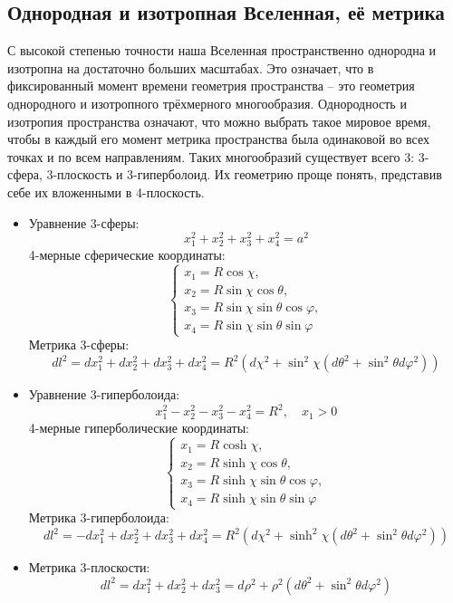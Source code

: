 \documentclass[12pt]{article}
\theoremstyle{definition}
\begin{document}
\subsection{Однородная и изотропная Вселенная, её метрика}
С высокой степенью точности наша Вселенная пространственно однородна и изотропна на достаточно больших масштабах. Это означает, что в фиксированный момент времени геометрия пространства -- это геометрия однородного и изотропного трёхмерного многообразия. Однородность и изотропия пространства означают, что можно выбрать такое мировое время, чтобы в каждый его момент метрика пространства была одинаковой во всех точках и по всем направлениям. Таких многообразий существует всего 3: 3-сфера, 3-плоскость и 3-гиперболоид. Их геометрию проще понять, представив себе их вложенными в 4-плоскость.
\begin{itemize}
    \item Уравнение 3-сферы:
    \begin{equation}
        x_1^2+x_2^2+x_3^2+x_4^2=a^2
    \end{equation}
    4-мерные сферические координаты:
    \begin{equation}
        \begin{cases}
            x_1=R\cos\chi,\\
            x_2=R\sin\chi\cos\theta,\\
            x_3=R\sin\chi\sin\theta\cos\varphi,\\
            x_4=R\sin\chi\sin\theta\sin\varphi
        \end{cases}
    \end{equation}
    Метрика 3-сферы:
    \begin{equation}
        dl^2=dx_1^2+dx_2^2+dx_3^2+dx_4^2=R^2(d\chi^2+\sin^2\chi(d\theta^2+\sin^2\theta d\varphi^2))
    \end{equation}
    \item Уравнение 3-гиперболоида:
    \begin{equation}
        x_1^2-x_2^2-x_3^2-x_4^2=R^2,\quad x_1>0
    \end{equation}
    4-мерные гиперболические координаты:
    \begin{equation}
        \begin{cases}
            x_1=R\cosh\chi,\\
            x_2=R\sinh\chi\cos\theta,\\
            x_3=R\sinh\chi\sin\theta\cos\varphi,\\
            x_4=R\sinh\chi\sin\theta\sin\varphi
        \end{cases}
    \end{equation}
    Метрика 3-гиперболоида:
    \begin{equation}
        dl^2=-dx_1^2+dx_2^2+dx_3^2+dx_4^2=R^2(d\chi^2+\sinh^2\chi(d\theta^2+\sin^2\theta d\varphi^2))
    \end{equation}
    \item Метрика 3-плоскости:
    \begin{equation}
        dl^2=dx_1^2+dx_2^2+dx_3^2=d\rho^2+\rho^2(d\theta^2+\sin^2\theta d\varphi^2)
    \end{equation}
\end{itemize}
\end{document}
